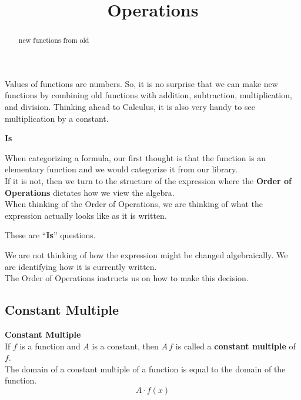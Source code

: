 \documentclass{ximera}
\title{Operations}
\begin{document}
\begin{abstract}
new functions from old
\end{abstract}
\maketitle



Values of functions are numbers.  So, it is no surprise that we can make new functions by combining old functions with addition, subtraction, multiplication, and division. Thinking ahead to Calculus, it is also very handy to see multiplication by a constant.\\




\begin{warning}  \textbf{\textcolor{red!70!black}{Is}}


When categorizing a formula, our first thought is that the function is an elementary function and we would categorize it from our library. \\

If it is not, then we turn to the structure of the expression where the \textbf{Order of Operations} dictates how we view the algebra. \\

When thinking of the Order of Operations, we are thinking of what the expression actually looks like as it is written.


\begin{center}
These are ``\textbf{\textcolor{red!70!black}{Is}}'' questions.
\end{center}

We are not thinking of how the expression might be changed algebraically.  We are identifying how it is currently written. \\

The Order of Operations instructs us on how to make this decision.

\end{warning}



\subsection*{Constant Multiple}


\begin{template}  \textbf{\textcolor{blue!55!black}{Constant Multiple}} \\


If  $f$ is a function and $A$ is a constant, then $A \, f$ is called a \textbf{\textcolor{green!50!black}{constant multiple}} of $f$. \\

The domain of a constant multiple of a function is equal to the domain of the function. \\


\[ A \cdot f(x)  \]



\end{template}
\end{document}
